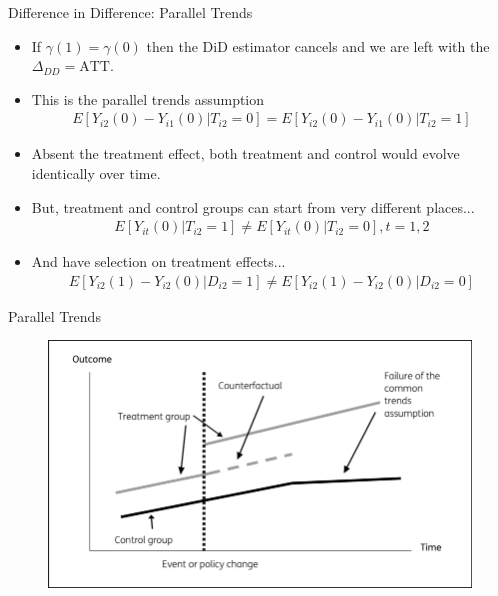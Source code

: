 \documentclass[xcolor=pdftex,dvipsnames,table,mathserif,aspectratio=169]{beamer}
\begin{document}
\begin{frame}{Difference in Difference: Parallel Trends}
\small
\begin{itemize}
\item If $\gamma(1) = \gamma(0)$ then the DiD estimator cancels and we are left with the $\Delta_{DD} = \text{ATT}$.
\item This is the \alert{parallel trends assumption}
\begin{align*}
E\left[Y_{i2}(0) - Y_{i1}(0) | T_{i2}=0 \right] = E\left[Y_{i2}(0) - Y_{i1}(0) | T_{i2}=1 \right]
\end{align*}
\item Absent the treatment effect, both treatment and control would evolve identically over time.
\item But, treatment and control groups can start from very different places...
\begin{align*}
E\left[Y_{i t}(0) | T_{i 2}=1\right] \neq E\left[Y_{i t}(0) | T_{i 2}=0\right], t=1,2
\end{align*}
\item And have selection on treatment effects...
\begin{align*}
E\left[Y_{i 2}(1)-Y_{i 2}(0) | D_{i 2}=1\right] \neq E\left[Y_{i 2}(1)-Y_{i 2}(0) | D_{i 2}=0\right]
\end{align*}
\end{itemize}
\end{frame}


\begin{frame}{Parallel Trends}
\begin{figure}
\centering
\includegraphics[width=5in]{./resources/common_trend.png}
\end{figure}
\end{frame}
\end{document}
